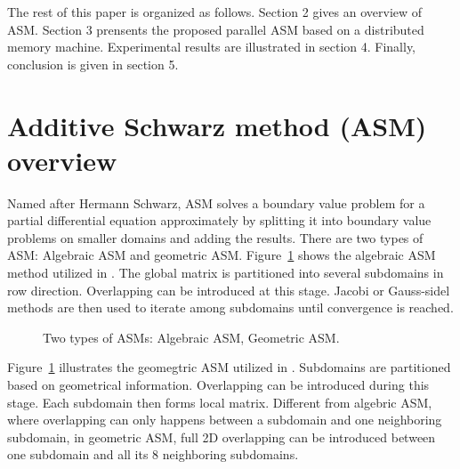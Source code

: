 \documentclass{sig-alternate}
\begin{document}
	The rest of this paper is organized as follows. Section 2 gives an overview of ASM. Section 3 prensents 
	the proposed parallel ASM based on a distributed memory machine. Experimental results are illustrated in section 4. 
	Finally, conclusion is given in section 5.

\section{Additive Schwarz method (ASM) overview}	
	Named after Hermann Schwarz, ASM solves a boundary value problem for a partial 
	differential equation approximately by splitting it into boundary value problems on smaller domains and adding the results.
	There are two types of ASM: Algebraic ASM and geometric ASM. 
	Figure~\ref{Fig2} shows the algebraic ASM method utilized in \cite{kaisun}. The global matrix
	is partitioned into several subdomains in row direction. 
	Overlapping can be introduced at this stage. Jacobi or Gauss-sidel methods are then used to iterate among subdomains until 
	convergence is reached.
	\begin{figure}[htbp]
	  \caption{Two types of ASMs: 
	   Algebraic ASM,
	   Geometric ASM.}
	  \label{Fig2}
	\end{figure}
	Figure~\ref{Fig2} illustrates the geomegtric ASM utilized in \cite{Zhongyu}. Subdomains are partitioned based on
	geometrical information. Overlapping can be introduced during this stage. Each subdomain then forms local matrix.
	Different from algebric ASM, where overlapping can only happens between a subdomain and one neighboring subdomain, in 
	geometric ASM, full 2D overlapping can be introduced between one subdomain and all its 8 neighboring subdomains.
	
\end{document}

